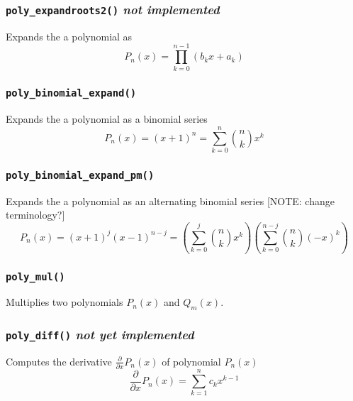 \subsubsection{{\tt poly\_expandroots2()} {\it not implemented}}
Expands the a polynomial as
\[
    P_n(x) = \prod_{k=0}^{n-1}{(b_kx+a_k)}
\]

\subsubsection{{\tt poly\_binomial\_expand()}}
Expands the a polynomial as a binomial series
\[
    P_n(x) = (x+1)^n = \sum_{k=0}^{n}{ {n \choose k} x^k}
\]

\subsubsection{{\tt poly\_binomial\_expand\_pm()}}
Expands the a polynomial as an alternating binomial series
[NOTE: change terminology?]
\[
    P_n(x) = (x+1)^j (x-1)^{n-j}
           = \left( \sum_{k=0}^{j}  { {n \choose k}    x^k} \right)
             \left( \sum_{k=0}^{n-j}{ {n \choose k} (-x)^k} \right)
\]

\subsubsection{{\tt poly\_mul()}}
Multiplies two polynomials $P_n(x)$ and $Q_m(x)$.

\subsubsection{{\tt poly\_diff()} {\it not yet implemented}}
Computes the derivative $\frac{\partial}{\partial x}P_n(x)$ of polynomial
$P_n(x)$
\[
    \frac{\partial}{\partial x}P_n(x) = \sum_{k=1}^{n}{c_{k}x^{k-1}}
\]

